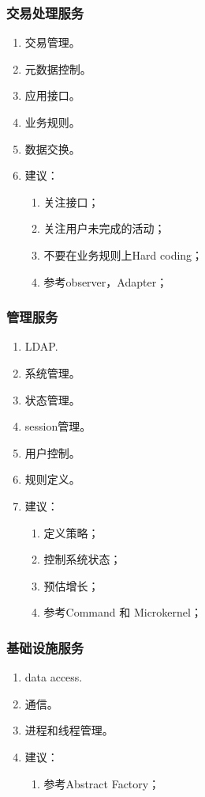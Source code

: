 \subsubsection{交易处理服务}
\begin{enumerate}
   \item 交易管理。
   \item 元数据控制。
   \item 应用接口。
   \item 业务规则。
   \item 数据交换。
   \item 建议：
       \begin{enumerate}[label=(\arabic*)]
       \item 关注接口；
       \item 关注用户未完成的活动；
       \item 不要在业务规则上Hard coding；
       \item 参考observer，Adapter；
     \end{enumerate}
\end{enumerate}

\subsubsection{管理服务}
\begin{enumerate}
   \item LDAP.
   \item 系统管理。
   \item 状态管理。
   \item session管理。
   \item 用户控制。
   \item 规则定义。
   \item 建议：
       \begin{enumerate}[label=(\arabic*)]
       \item 定义策略；
       \item 控制系统状态；
       \item 预估增长；
       \item 参考Command 和 Microkernel；
     \end{enumerate}
\end{enumerate}

\subsubsection{基础设施服务}
\begin{enumerate}
   \item data access.
   \item 通信。
   \item 进程和线程管理。   
   \item 建议：
       \begin{enumerate}[label=(\arabic*)]      
       \item 参考Abstract Factory；
     \end{enumerate}
\end{enumerate}


